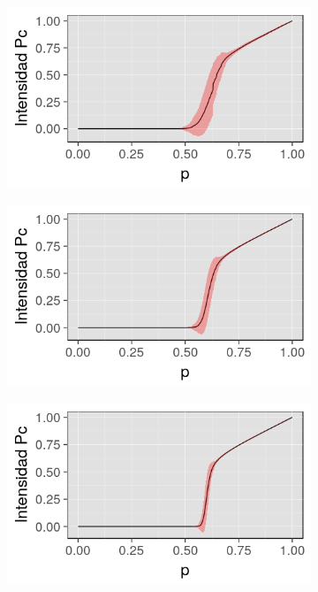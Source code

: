 \documentclass[%
 reprint,
 amsmath,amssymb,
 aps,
spanish]{revtex4-1}
\begin{document}
\begin{figure}[h]
\begin{subfigure}{.25\textwidth}
  \label{fig:216x16}
\end{subfigure}%
\begin{subfigure}{.25\textwidth}
  \centering
  \includegraphics[width=.9\linewidth]{ej2/32x32}
  \label{fig:232x32}
\end{subfigure}
\begin{subfigure}{.25\textwidth}
  \centering
  \includegraphics[width=.9\linewidth]{ej2/64x64}
  \label{fig:264x64}
\end{subfigure}%
\begin{subfigure}{.25\textwidth}
  \centering
  \includegraphics[width=.9\linewidth]{ej2/128x128}

\end{subfigure}
\end{figure}
\end{document}
